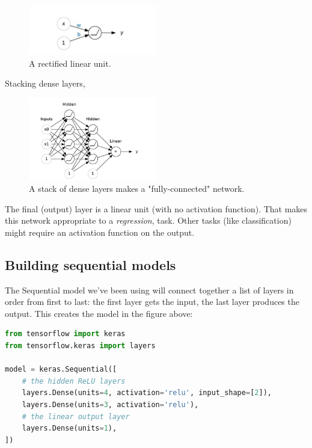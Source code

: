 \begin{figure}[htp]
	\centering
	\includegraphics[width=0.5\textwidth]{../assets/machine_learning_random/rectified_linear_unit.jpg}
	\caption{A rectified linear unit.}
\end{figure}

\noindent Stacking dense layers,

\begin{figure}[htp]
	\centering
	\includegraphics[width=0.5\textwidth]{../assets/machine_learning_random/stack_of_dense_layers.jpg}
	\caption{A stack of dense layers makes a "fully-connected" network.}
\end{figure}

\noindent The final (output) layer is a linear unit (with no activation function).
That makes this network appropriate to a \emph{regression}, task. Other tasks (like
classification) might require an activation function on the output.

\subsection{Building sequential models}
The Sequential model we've been using will connect together a list of layers
in order from first to last: the first layer gets the input, the last layer
produces the output. This creates the model in the figure above:

\begin{lstlisting}[language=Python]
from tensorflow import keras
from tensorflow.keras import layers

model = keras.Sequential([
    # the hidden ReLU layers
    layers.Dense(units=4, activation='relu', input_shape=[2]),
    layers.Dense(units=3, activation='relu'),
    # the linear output layer 
    layers.Dense(units=1),
])
\end{lstlisting}

